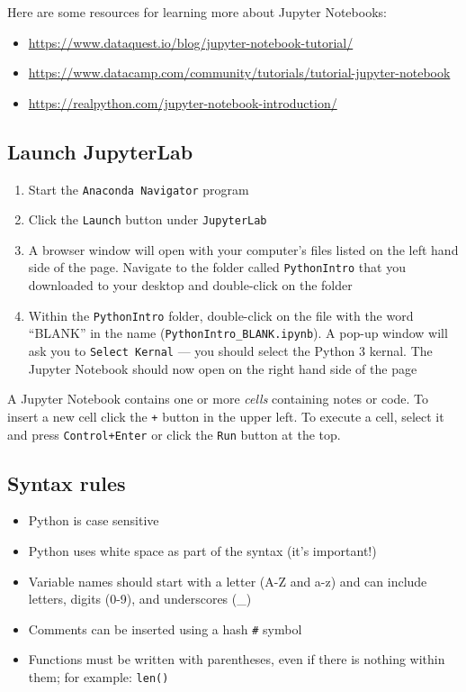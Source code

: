 \documentclass[]{book}
\providecommand{\tightlist}{%
  \setlength{\itemsep}{0pt}\setlength{\parskip}{0pt}}
\begin{document}
Here are some resources for learning more about Jupyter Notebooks:

\begin{itemize}
\tightlist
\item
  \url{https://www.dataquest.io/blog/jupyter-notebook-tutorial/}
\item
  \url{https://www.datacamp.com/community/tutorials/tutorial-jupyter-notebook}
\item
  \url{https://realpython.com/jupyter-notebook-introduction/}
\end{itemize}

\hypertarget{launch-jupyterlab-1}{%
\subsection{Launch JupyterLab}\label{launch-jupyterlab-1}}

\begin{enumerate}
\def\labelenumi{\arabic{enumi}.}
\tightlist
\item
  Start the \texttt{Anaconda\ Navigator} program
\item
  Click the \texttt{Launch} button under \texttt{JupyterLab}
\item
  A browser window will open with your computer's files listed on the left hand side of the page. Navigate to the folder called \texttt{PythonIntro} that you downloaded to your desktop and double-click on the folder
\item
  Within the \texttt{PythonIntro} folder, double-click on the file with the word ``BLANK'' in the name (\texttt{PythonIntro\_BLANK.ipynb}). A pop-up window will ask you to \texttt{Select\ Kernal} --- you should select the Python 3 kernal. The Jupyter Notebook should now open on the right hand side of the page
\end{enumerate}

A Jupyter Notebook contains one or more \emph{cells} containing notes or code. To insert a new cell click the \texttt{+} button in the upper left. To execute a cell, select it and press \texttt{Control+Enter} or click the \texttt{Run} button at the top.

\hypertarget{syntax-rules-1}{%
\subsection{Syntax rules}\label{syntax-rules-1}}

\begin{itemize}
\tightlist
\item
  Python is case sensitive
\item
  Python uses white space as part of the syntax (it's important!)
\item
  Variable names should start with a letter (A-Z and a-z)
  and can include letters, digits (0-9), and underscores (\_)
\item
  Comments can be inserted using a hash \texttt{\#} symbol
\item
  Functions must be written with parentheses, even
  if there is nothing within them; for example: \texttt{len()}
\end{itemize}
\end{document}
